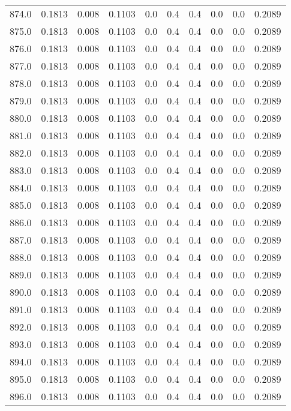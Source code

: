 \begin{longtable}{lrrrrrrrrr}
874.0 & 0.1813 & 0.008 & 0.1103 & 0.0 & 0.4 & 0.4 & 0.0 & 0.0 & 0.2089 \\
875.0 & 0.1813 & 0.008 & 0.1103 & 0.0 & 0.4 & 0.4 & 0.0 & 0.0 & 0.2089 \\
876.0 & 0.1813 & 0.008 & 0.1103 & 0.0 & 0.4 & 0.4 & 0.0 & 0.0 & 0.2089 \\
877.0 & 0.1813 & 0.008 & 0.1103 & 0.0 & 0.4 & 0.4 & 0.0 & 0.0 & 0.2089 \\
878.0 & 0.1813 & 0.008 & 0.1103 & 0.0 & 0.4 & 0.4 & 0.0 & 0.0 & 0.2089 \\
879.0 & 0.1813 & 0.008 & 0.1103 & 0.0 & 0.4 & 0.4 & 0.0 & 0.0 & 0.2089 \\
880.0 & 0.1813 & 0.008 & 0.1103 & 0.0 & 0.4 & 0.4 & 0.0 & 0.0 & 0.2089 \\
881.0 & 0.1813 & 0.008 & 0.1103 & 0.0 & 0.4 & 0.4 & 0.0 & 0.0 & 0.2089 \\
882.0 & 0.1813 & 0.008 & 0.1103 & 0.0 & 0.4 & 0.4 & 0.0 & 0.0 & 0.2089 \\
883.0 & 0.1813 & 0.008 & 0.1103 & 0.0 & 0.4 & 0.4 & 0.0 & 0.0 & 0.2089 \\
884.0 & 0.1813 & 0.008 & 0.1103 & 0.0 & 0.4 & 0.4 & 0.0 & 0.0 & 0.2089 \\
885.0 & 0.1813 & 0.008 & 0.1103 & 0.0 & 0.4 & 0.4 & 0.0 & 0.0 & 0.2089 \\
886.0 & 0.1813 & 0.008 & 0.1103 & 0.0 & 0.4 & 0.4 & 0.0 & 0.0 & 0.2089 \\
887.0 & 0.1813 & 0.008 & 0.1103 & 0.0 & 0.4 & 0.4 & 0.0 & 0.0 & 0.2089 \\
888.0 & 0.1813 & 0.008 & 0.1103 & 0.0 & 0.4 & 0.4 & 0.0 & 0.0 & 0.2089 \\
889.0 & 0.1813 & 0.008 & 0.1103 & 0.0 & 0.4 & 0.4 & 0.0 & 0.0 & 0.2089 \\
890.0 & 0.1813 & 0.008 & 0.1103 & 0.0 & 0.4 & 0.4 & 0.0 & 0.0 & 0.2089 \\
891.0 & 0.1813 & 0.008 & 0.1103 & 0.0 & 0.4 & 0.4 & 0.0 & 0.0 & 0.2089 \\
892.0 & 0.1813 & 0.008 & 0.1103 & 0.0 & 0.4 & 0.4 & 0.0 & 0.0 & 0.2089 \\
893.0 & 0.1813 & 0.008 & 0.1103 & 0.0 & 0.4 & 0.4 & 0.0 & 0.0 & 0.2089 \\
894.0 & 0.1813 & 0.008 & 0.1103 & 0.0 & 0.4 & 0.4 & 0.0 & 0.0 & 0.2089 \\
895.0 & 0.1813 & 0.008 & 0.1103 & 0.0 & 0.4 & 0.4 & 0.0 & 0.0 & 0.2089 \\
896.0 & 0.1813 & 0.008 & 0.1103 & 0.0 & 0.4 & 0.4 & 0.0 & 0.0 & 0.2089 \\

\end{longtable}
